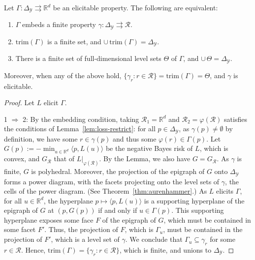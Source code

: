 \documentclass[anon,12pt]{colt2019}
\newcommand{\reals}{\mathbb{R}}
\newcommand{\simplex}{\Delta_\Y}
\newcommand{\R}{\mathcal{R}}
\newcommand{\Y}{\mathcal{Y}}
\newcommand{\inprod}[2]{\langle #1, #2 \rangle}%
\newcommand{\toto}{\rightrightarrows}
\newcommand{\trim}{\mathrm{trim}}
\begin{document}
\begin{proposition}\label{prop:embed-trim}
  Let $\Gamma:\simplex\toto\reals^d$ be an elicitable property.
  The following are equivalent:
  \begin{enumerate}
  \item $\Gamma$ embeds a finite property $\gamma:\simplex \toto \R$.
  \item $\trim(\Gamma)$ is a finite set, and $\cup\,\trim(\Gamma) = \simplex$.
  \item There is a finite set of full-dimensional level sets $\Theta$ of $\Gamma$, and $\cup\,\Theta = \simplex$.
  \end{enumerate}
  Moreover, when any of the above hold, $\{\gamma_r : r\in\R\} = \trim(\Gamma) = \Theta$, and $\gamma$ is elicitable.
\end{proposition}
\begin{proof}
  Let $L$ elicit $\Gamma$.

  1 $\Rightarrow$ 2:
  By the embedding condition, taking $\R_1 = \reals^d$ and $\R_2 = \varphi(\R)$ satisfies the conditions of Lemma~\ref{lem:loss-restrict}: for all $p\in\simplex$, as $\gamma(p) \neq \emptyset$ by definition, we have some $r\in\gamma(p)$ and thus some $\varphi(r) \in \Gamma(p)$.
  Let $G(p) := -\min_{u\in\reals^d} \inprod{p}{L(u)}$ be the negative Bayes risk of $L$, which is convex, and $G_{\R}$ that of $L|_{\varphi(\R)}$.
  By the Lemma, we also have $G = G_\R$.
  As $\gamma$ is finite, $G$ is polyhedral.
  Moreover, the projection of the epigraph of $G$ onto $\simplex$ forms a power diagram, with the facets projecting onto the level sets of $\gamma$, the cells of the power diagram.
  (See Theorem~\ref{thm:aurenhammer}.)
  As $L$ elicits $\Gamma$, for all $u\in\reals^d$, the hyperplane $p\mapsto \inprod{p}{L(u)}$ is a supporting hyperplane of the epigraph of $G$ at $(p,G(p))$ if and only if $u\in\Gamma(p)$.
  This supporting hyperplane exposes some face $F$ of the epigraph of $G$, which must be contained in some facet $F'$.
  Thus, the projection of $F$, which is $\Gamma_u$, must be contained in the projection of $F'$, which is a level set of $\gamma$.
  We conclude that $\Gamma_u \subseteq \gamma_r$ for some $r\in\R$.
  Hence, $\trim(\Gamma) = \{\gamma_r : r\in\R\}$, which is finite, and unions to $\simplex$.



\end{proof}
\end{document}
